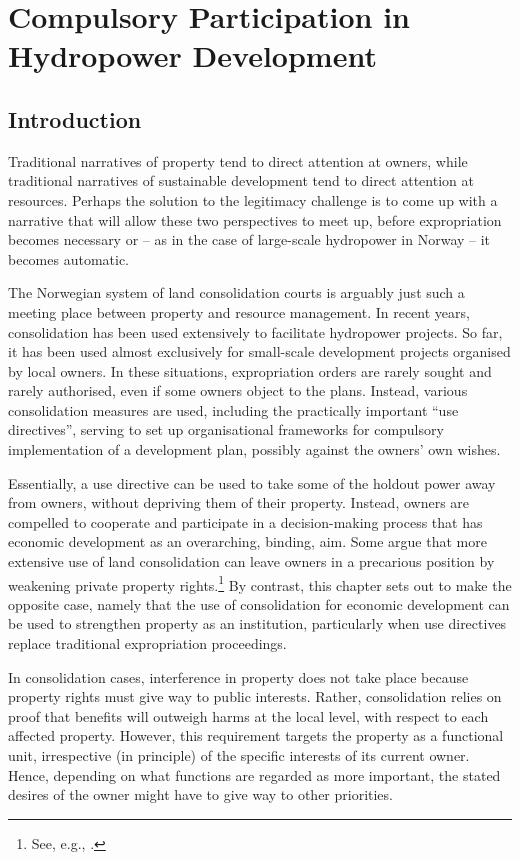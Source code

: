 \chapter{Compulsory Participation in Hydropower Development}\label{chap:6}

\section{Introduction}\label{sec:intro6}

Traditional narratives of property tend to direct attention at owners, while traditional narratives of sustainable development tend to direct attention at resources. Perhaps the solution to the legitimacy challenge is to come up with a narrative that will allow these two perspectives to meet up, before expropriation becomes necessary or -- as in the case of large-scale hydropower in Norway -- it becomes automatic.

The Norwegian system of land consolidation courts is arguably just such a meeting place between property and resource management. In recent years, consolidation has been used extensively to facilitate hydropower projects. So far, it has been used almost exclusively for small-scale development projects organised by local owners. In these situations, expropriation orders are rarely sought and rarely authorised, even if some owners object to the plans. Instead, various consolidation measures are used, including the practically important ``use directives'', serving to set up organisational frameworks for compulsory implementation of a development plan, possibly against the owners' own wishes.

Essentially, a use directive can be used to take some of the holdout power away from owners, without depriving them of their property. Instead, owners are compelled to cooperate and participate in a decision-making process that has economic development as an overarching, binding, aim. Some argue that more extensive use of land consolidation can leave owners in a precarious position by weakening private property rights.\footnote{See, e.g., \cite{stenseth07}.} By contrast, this chapter sets out to make the opposite case, namely that the use of consolidation for economic development can be used to strengthen property as an institution, particularly when use directives replace traditional expropriation proceedings.

In consolidation cases, interference in property does not take place because property rights must give way to public interests. Rather, consolidation relies on proof that benefits will outweigh harms at the local level, with respect to each affected property. However, this requirement targets the property as a functional unit, irrespective (in principle) of the specific interests of its current owner. Hence, depending on what functions are regarded as more important, the stated desires of the owner might have to give way to other priorities.

